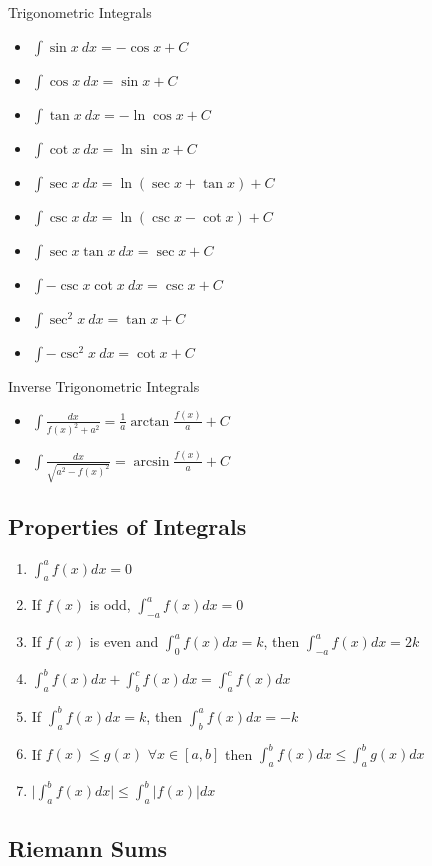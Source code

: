 Trigonometric Integrals
\begin{itemize}
    \item $\int{\sin{x}}\:dx=-\cos{x}+C$
    \item $\int{\cos{x}}\:dx=\sin{x}+C$
    \item $\int{\tan{x}}\:dx=-\ln{\cos{x}}+C$
    \item $\int{\cot{x}}\:dx=\ln{\sin{x}}+C$
    \item $\int{\sec{x}}\:dx=\ln{(\sec{x}+\tan{x})}+C$
    \item $\int{\csc{x}}\:dx=\ln{(\csc{x}-\cot{x})}+C$
    \item $\int{\sec{x}\tan{x}}\:dx=\sec{x}+C$
    \item $\int{-\csc{x}\cot{x}}\:dx=\csc{x}+C$
    \item $\int{\sec^2{x}}\:dx=\tan{x}+C$
    \item $\int{-\csc^2{x}}\:dx=\cot{x}+C$
\end{itemize}
Inverse Trigonometric Integrals
\begin{itemize}
    \item $\int{\frac{dx}{f(x)^2+a^2}}=\frac{1}{a}\arctan{\frac{f(x)}{a}}+C$
    \item $\int{\frac{dx}{\sqrt{a^2-f(x)^2}}}=\arcsin{\frac{f(x)}{a}}+C$
\end{itemize}

\subsection{Properties of Integrals}\label{subsec:properties-of-integrals}

\begin{enumerate}
    \item $\int_{a}^{a}f(x)dx=0$
    \item If $f(x)$ is odd, $\int_{-a}^{a}f(x)dx=0$
    \item If $f(x)$ is even and $\int_{0}^{a}f(x)dx=k$, then $\int_{-a}^{a}f(x)dx=2k$
    \item $\int_{a}^{b}f(x)dx+\int_{b}^{c}f(x)dx=\int_{a}^{c}f(x)dx$
    \item If $\int_{a}^{b}f(x)dx=k$, then $\int_{b}^{a}f(x)dx=-k$
    \item If $f(x) \leq g(x)$ $\forall x \in [a,b]$ then $\int_{a}^{b}f(x)dx \leq \int_{a}^{b}g(x)dx$
    \item $\vert \int_{a}^{b}f(x)dx \vert \leq \int_{a}^{b}|f(x)|dx$
\end{enumerate}

\subsection{Riemann Sums}\label{subsec:riemann-sums}

